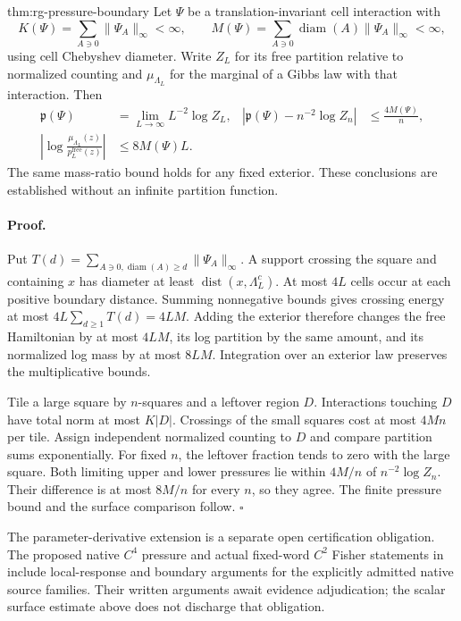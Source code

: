 {thm:rg-pressure-boundary}
Let $\Psi$ be a translation-invariant cell interaction with
\begin{equation}
 K(\Psi)=\sum_{A\ni0}\|\Psi_A\|_\infty<\infty,\qquad
 M(\Psi)=\sum_{A\ni0}\operatorname{diam}(A)\|\Psi_A\|_\infty<\infty,
 \label{eq:rg-pressure-moments}
\end{equation}
using cell Chebyshev diameter. Write $Z_L$ for its free partition relative
to normalized counting and $\mu_{\Lambda_L}$ for the marginal of a Gibbs
law with that interaction. Then
\begin{align}
 \mathfrak p(\Psi)&=\lim_{L\to\infty}L^{-2}\log Z_L,
 &\left|\mathfrak p(\Psi)-n^{-2}\log Z_n\right|&\leq\frac{4M(\Psi)}n,
 \label{eq:rg-pressure-limit}\\
 \left|\log\frac{\mu_{\Lambda_L}(z)}{p_L^{\mathrm{free}}(z)}\right|
 &\leq8M(\Psi)L.
 \label{eq:rg-pressure-surface}
\end{align}
The same mass-ratio bound holds for any fixed exterior. These conclusions
are established without an infinite partition function.

\paragraph{Proof.}
Put $T(d)=\sum_{A\ni0,\operatorname{diam}(A)\geq d}\|\Psi_A\|_\infty$.
A support crossing the square and containing $x$ has diameter at least
$\operatorname{dist}(x,\Lambda_L^c)$. At most $4L$ cells occur at each
positive boundary distance. Summing nonnegative bounds gives crossing
energy at most $4L\sum_{d\geq1}T(d)=4LM$. Adding the exterior therefore
changes the free Hamiltonian by at most $4LM$, its log partition by the
same amount, and its normalized log mass by at most $8LM$. Integration
over an exterior law preserves the multiplicative bounds.

Tile a large square by $n$-squares and a leftover region $D$. Interactions
touching $D$ have total norm at most $K|D|$. Crossings of the small squares
cost at most $4Mn$ per tile. Assign independent normalized counting to
$D$ and compare partition sums exponentially. For fixed $n$, the leftover
fraction tends to zero with the large square. Both limiting upper and
lower pressures lie within $4M/n$ of $n^{-2}\log Z_n$.
Their difference is at most $8M/n$ for every $n$, so they agree. The
finite pressure bound and the surface comparison follow.
$\square$

The parameter-derivative extension is a separate open certification
obligation. The proposed native $C^4$ pressure and actual fixed-word
$C^2$ Fisher statements in
include local-response and boundary arguments for the explicitly
admitted native source families. Their written arguments await evidence
adjudication; the scalar surface estimate above does not discharge that
obligation. 

